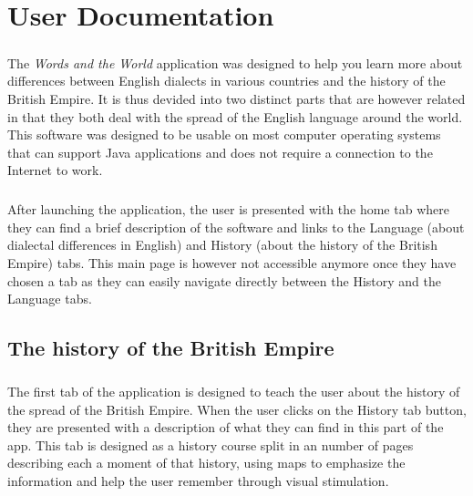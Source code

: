 \documentclass[11pt, a4paper]{report}
\begin{document}
\newpage
\tableofcontents
\newpage


\chapter*{User Documentation}
\paragraph{}The \textit{Words and the World} application was designed to help you learn more about differences between English dialects in various countries and the history of the British Empire. It is thus devided into two distinct parts that are however related in that they both deal with the spread of the English language around the world. This software was designed to be usable on most computer operating systems that can support Java applications and does not require a connection to the Internet to work.

\paragraph{}After launching the application, the user is presented with the home tab where they can find a brief description of the software and links to the Language (about dialectal differences in English) and History (about the history of the British Empire) tabs. This main page is however not accessible anymore once they have chosen a tab as they can easily navigate directly between the History and the Language tabs.

\section*{The history of the British Empire}
\paragraph{}The first tab of the application is designed to teach the user about the history of the spread of the British Empire. When the user clicks on the History tab button, they are presented with a description of what they can find in this part of the app. This tab is designed as a history course split in an number of pages describing each a moment of that history, using maps to emphasize the information and help the user remember through visual stimulation.
\vspace{0.3cm}
\end{document}

